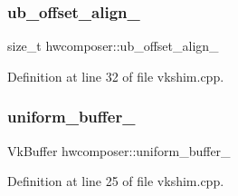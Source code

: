 \subsubsection{\texorpdfstring{ub\+\_\+offset\+\_\+align\+\_\+}{ub\_offset\_align\_}}
{\footnotesize\ttfamily size\+\_\+t hwcomposer\+::ub\+\_\+offset\+\_\+align\+\_\+}



Definition at line 32 of file vkshim.\+cpp.

\mbox{\label{namespacehwcomposer_a7f1b6f91ef21a2ba46ffc976c81d70ff}} 
\subsubsection{\texorpdfstring{uniform\+\_\+buffer\+\_\+}{uniform\_buffer\_}}
{\footnotesize\ttfamily Vk\+Buffer hwcomposer\+::uniform\+\_\+buffer\+\_\+}



Definition at line 25 of file vkshim.\+cpp.

